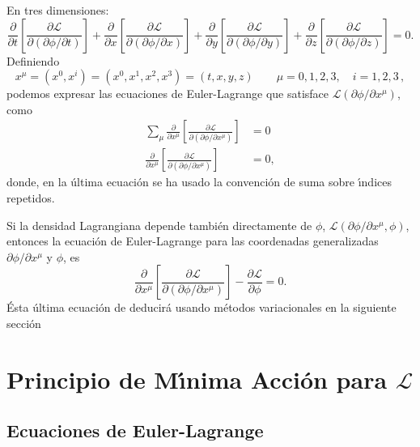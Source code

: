En tres dimensiones:
\begin{equation}
  \label{eq:eelcalls1m}
\frac{\partial}{\partial t}
  \left[
    \frac{\partial\mathcal{L}}{\partial
      (\partial\phi/\partial t)}
  \right]+\frac{\partial}{\partial x}
  \left[
    \frac{\partial\mathcal{L}}{\partial
      (\partial\phi/\partial x)}
  \right]+\frac{\partial}{\partial y}
  \left[
    \frac{\partial\mathcal{L}}{\partial
      (\partial\phi/\partial y)}
  \right]+\frac{\partial}{\partial z}
  \left[
    \frac{\partial\mathcal{L}}{\partial
      (\partial\phi/\partial z)}
  \right]=0.
\end{equation}
Definiendo
\begin{equation}
  \label{eq:xmu}
  x^\mu=(x^0,x^i)=(x^0,x^1,x^2,x^3)=(t,x,y,z) \qquad \mu=0,1,2,3,\quad i=1,2,3\,,
\end{equation}
podemos expresar las ecuaciones de Euler-Lagrange que satisface
$\mathcal{L}(\partial\phi/\partial x^\mu)$, como
\begin{align*}
 \sum_\mu\frac{\partial}{\partial x^\mu}
  \left[
    \frac{\partial\mathcal{L}}{\partial
      (\partial\phi/\partial x^\mu)}
  \right]&=0\\
 \frac{\partial}{\partial x^\mu}
  \left[
    \frac{\partial\mathcal{L}}{\partial
      (\partial\phi/\partial x^\mu)}
  \right]&=0,
\end{align*}
donde, en la \'ultima ecuaci\'on se ha usado la convenci\'on de suma sobre
\'\i ndices repetidos. 

Si la densidad Lagrangiana depende tambi\'en directamente de $\phi$,
$\mathcal{L}(\partial\phi/\partial x^\mu,\phi)$, entonces la ecuaci\'on de Euler-Lagrange para
las coordenadas generalizadas  $\partial\phi/\partial x^\mu$ y $\phi$, es
\begin{equation}
\label{eq:eelcallf}
 \frac{\partial}{\partial x^\mu}
  \left[
    \frac{\partial\mathcal{L}}{\partial
      (\partial\phi/\partial x^\mu)}
  \right]-\frac{\partial\mathcal{L}}{\partial\phi}=0.
\end{equation}
\'Esta \'ultima ecuaci\'on de deducir\'a usando m\'etodos variacionales en la
siguiente secci\'on

\section{Principio de M\'\i nima Acci\'on para $\mathcal{L}$}
\label{sec:principio-de-minima-call}
\subsection{Ecuaciones de Euler-Lagrange}

